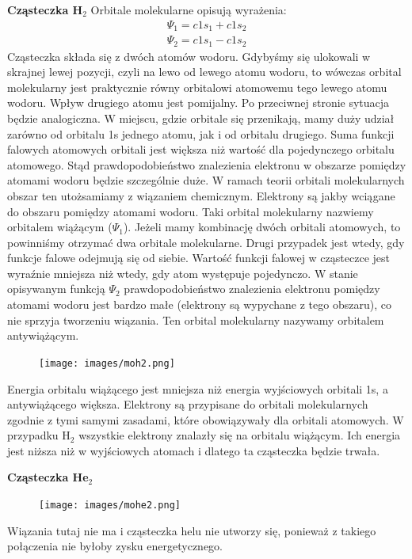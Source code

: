 \documentclass{article}
\begin{document}
\textbf{Cząsteczka H$_2$}
Orbitale molekularne opisują wyrażenia:
\begin{gather*}
    \Psi_1=c1s_1+c1s_2\\
    \Psi_2=c1s_1-c1s_2
\end{gather*}
Cząsteczka składa się z dwóch atomów wodoru. Gdybyśmy się ulokowali w skrajnej lewej pozycji, czyli na lewo od lewego atomu wodoru, to wówczas orbital molekularny jest praktycznie równy orbitalowi atomowemu tego lewego atomu wodoru. Wpływ drugiego atomu jest pomijalny. Po przeciwnej stronie sytuacja będzie analogiczna. W miejscu, gdzie orbitale się przenikają, mamy duży udział zarówno od orbitalu 1s jednego atomu, jak i od orbitalu drugiego. Suma funkcji falowych atomowych orbitali jest większa niż wartość dla pojedynczego orbitalu atomowego. Stąd prawdopodobieństwo znalezienia elektronu w obszarze pomiędzy atomami wodoru będzie szczególnie duże. W ramach teorii orbitali molekularnych obszar ten utożsamiamy z wiązaniem chemicznym. Elektrony są jakby wciągane do obszaru pomiędzy atomami wodoru. Taki orbital molekularny nazwiemy orbitalem wiążącym ($\Psi_1$). Jeżeli mamy kombinację dwóch orbitali atomowych, to powinniśmy otrzymać dwa orbitale molekularne. Drugi przypadek jest wtedy, gdy funkcje falowe odejmują się od siebie. Wartość funkcji falowej w cząsteczce jest wyraźnie mniejsza niż wtedy, gdy atom występuje pojedynczo. W stanie opisywanym funkcją $\Psi_2$  prawdopodobieństwo znalezienia elektronu pomiędzy atomami wodoru jest bardzo małe (elektrony są wypychane z tego obszaru), co nie sprzyja tworzeniu wiązania. Ten orbital molekularny nazywamy orbitalem antywiążącym. 
\begin{figure}[H]
    \centering
    \texttt{[image: images/moh2.png]}
\end{figure}
Energia orbitalu wiążącego jest mniejsza niż energia wyjściowych orbitali 1s, a antywiążącego większa. Elektrony są przypisane do orbitali molekularnych zgodnie z tymi samymi zasadami, które obowiązywały dla orbitali atomowych. W przypadku H$_2$ wszystkie elektrony znalazły się na orbitalu wiążącym. Ich energia jest niższa niż w wyjściowych atomach i dlatego ta cząsteczka będzie trwała.  

\textbf{Cząsteczka He$_2$}
\begin{figure}[H]
    \centering
    \texttt{[image: images/mohe2.png]}
\end{figure}
 Wiązania tutaj nie ma  i cząsteczka helu nie utworzy się, ponieważ z takiego połączenia nie byłoby zysku energetycznego.
\end{document}

